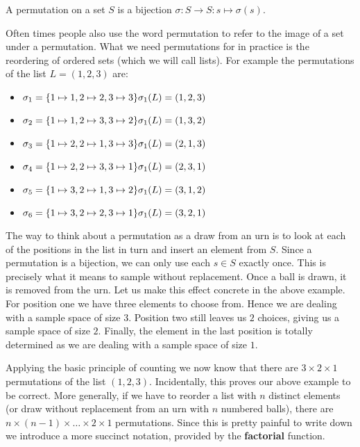 \begin{Definition} 
A permutation on a set $ S $ is a bijection $ \sigma : S \rightarrow S : s \mapsto \sigma(s) $.
\end{Definition}

Often times people also use the word permutation to refer to the image of a set under a permutation. What we
need permutations for in practice is the reordering of ordered sets (which we will call lists). For example
the permutations of the list $ L = (1,2,3) $ are:
\begin{itemize}
\item $ \sigma_{1} = \{1 \mapsto 1, 2 \mapsto 2, 3 \mapsto 3 \} \hfill \sigma_{1}(L) = (1,2,3) $
\item $ \sigma_{2} = \{1 \mapsto 1, 2 \mapsto 3, 3 \mapsto 2 \} \hfill \sigma_{1}(L) = (1,3,2) $
\item $ \sigma_{3} = \{1 \mapsto 2, 2 \mapsto 1, 3 \mapsto 3 \} \hfill \sigma_{1}(L) = (2,1,3) $
\item $ \sigma_{4} = \{1 \mapsto 2, 2 \mapsto 3, 3 \mapsto 1 \} \hfill \sigma_{1}(L) = (2,3,1) $
\item $ \sigma_{5} = \{1 \mapsto 3, 2 \mapsto 1, 3 \mapsto 2 \} \hfill \sigma_{1}(L) = (3,1,2) $
\item $ \sigma_{6} = \{1 \mapsto 3, 2 \mapsto 2, 3 \mapsto 1 \} \hfill \sigma_{1}(L) = (3,2,1) $
\end{itemize}

The way to think about a permutation as a draw from an urn is to look at each of the positions in the list in
turn and insert an element from $ S $. Since a permutation is a bijection, we can only use each
$ s \in S $ exactly once. This is precisely what it means to sample without replacement. Once a ball
is drawn, it is removed from the urn. Let us make this effect concrete in the above example. For position one
we have three elements to choose from. Hence we are dealing with a sample space of size $ 3 $. Position two
still leaves us $ 2 $ choices, giving us a sample space of size $ 2 $. Finally, the element in the last position
is totally determined as we are dealing with a sample space of size $ 1 $.

Applying the basic principle of counting we now know that there are $ 3 \times 2 \times 1 $ permutations of the list
$ (1,2,3) $. Incidentally, this proves our above example to be correct. More generally, if we have to reorder
a list with $ n $ distinct elements (or draw without replacement from an urn with $ n $ numbered balls), there
are $ n \times (n-1) \times \ldots \times 2 \times 1 $ permutations. Since this is pretty painful to write down
we introduce a more succinct notation, provided by the \textbf{factorial} function.

